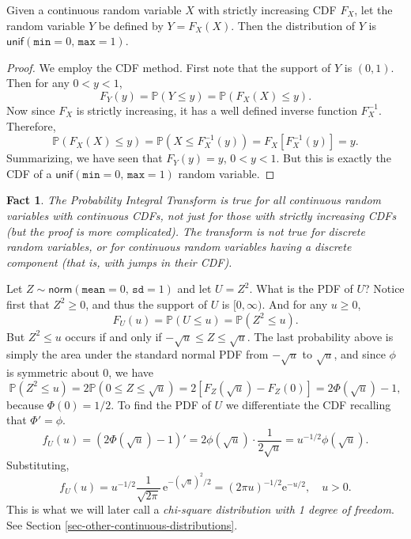 \documentclass[]{book}
\numberwithin{equation}{chapter}
\numberwithin{figure}{chapter}
\theoremstyle{plain}
\newtheorem{fact}[thm]{Fact}
\theoremstyle{definition}
\theoremstyle{remark}
\theoremstyle{definition}
\theoremstyle{definition}
\theoremstyle{remark}
\let\BeginKnitrBlock\begin \let\EndKnitrBlock\end
\begin{document}
\bigskip

\BeginKnitrBlock{proposition}[The Probability Integral Transform]
\protect\hypertarget{prp:unnamed-chunk-282}{}{\label{prp:unnamed-chunk-282}
\iffalse (The Probability Integral Transform) \fi }Given a continuous
random variable \(X\) with strictly increasing CDF \(F_{X}\), let the
random variable \(Y\) be defined by \(Y=F_{X}(X)\). Then the
distribution of \(Y\) is
\(\mathsf{unif}(\mathtt{min}=0,\,\mathtt{max}=1)\).
\EndKnitrBlock{proposition}

\bigskip

\BeginKnitrBlock{proof}
\iffalse {Proof. } \fi We employ the CDF method. First note that the
support of \(Y\) is \((0,1)\). Then for any \(0<y<1\),
\[ F_{Y}(y)=\mathbb{P}(Y\leq
y)=\mathbb{P}(F_{X}(X)\leq y).  \] Now since \(F_{X}\) is strictly
increasing, it has a well defined inverse function \(F_{X}^{-1}\).
Therefore, \[ \mathbb{P}(F_{X}(X)\leq
y)=\mathbb{P}(X\leq F_{X}^{-1}(y))=F_{X}[F_{X}^{-1}(y)]=y.  \]
Summarizing, we have seen that \(F_{Y}(y)=y\), \(0<y<1\). But this is
exactly the CDF of a \(\mathsf{unif}(\mathtt{min}=0,\,\mathtt{max}=1)\)
random variable.
\EndKnitrBlock{proof}

\bigskip

\begin{fact}
The Probability Integral Transform is true for all continuous random
variables with continuous CDFs, not just for those with strictly
increasing CDFs (but the proof is more complicated). The transform is
\emph{not} true for discrete random variables, or for continuous random
variables having a discrete component (that is, with jumps in their
CDF).
\end{fact}

\bigskip

\BeginKnitrBlock{example}
\protect\hypertarget{ex:distn-of-z-squared}{}{\label{ex:distn-of-z-squared}}Let
\(Z\sim\mathsf{norm}(\mathtt{mean}=0,\,\mathtt{sd}=1)\) and let
\(U=Z^{2}\). What is the PDF of \(U\)? Notice first that \(Z^{2}\geq0\),
and thus the support of \(U\) is \([0,\infty)\). And for any \(u\geq0\),
\[ F_{U}(u)=\mathbb{P}(U\leq
u)=\mathbb{P}(Z^{2}\leq u).  \] But \(Z^{2}\leq u\) occurs if and only
if \(-\sqrt{u}\leq Z\leq\sqrt{u}\). The last probability above is simply
the area under the standard normal PDF from \(-\sqrt{u}\) to
\(\sqrt{u}\), and since \(\phi\) is symmetric about 0, we have \[
\mathbb{P}(Z^{2}\leq u)=2\mathbb{P}(0\leq
Z\leq\sqrt{u})=2\left[F_{Z}(\sqrt{u})-F_{Z}(0)\right]=2\Phi(\sqrt{u})-1,
\] because \(\Phi(0)=1/2\). To find the PDF of \(U\) we differentiate
the CDF recalling that \(\Phi'= \phi\). \[
f_{U}(u)=\left(2\Phi(\sqrt{u})-1\right)'=2\phi(\sqrt{u})\cdot\frac{1}{2\sqrt{u}}=u^{-1/2}\phi(\sqrt{u}).
\] Substituting, \[ f_{U}(u) =
u^{-1/2}\frac{1}{\sqrt{2\pi}}\,\mathrm{e}^{-(\sqrt{u})^{2}/2}=(2\pi
u)^{-1/2}\mathrm{e}^{-u/2},\quad u > 0.  \] This is what we will later
call a \emph{chi-square distribution with 1 degree of freedom}. See
Section \ref{sec-other-continuous-distributions}.
\EndKnitrBlock{example}
\end{document}
